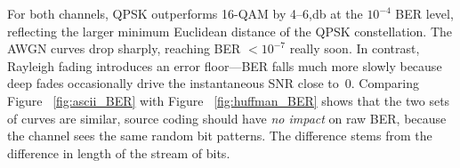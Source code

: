 For both channels, QPSK outperforms 16-QAM by 4–6,\si{\decibel} at the $10^{-4}$ BER level, reflecting the larger minimum Euclidean distance of the QPSK constellation. The AWGN curves drop sharply, reaching BER \(<10^{-7}\) really soon. In contrast, Rayleigh fading introduces an error floor—BER falls much more slowly because deep fades occasionally drive the instantaneous SNR close to~0. Comparing Figure ~\ref{fig:ascii_BER} with Figure ~\ref{fig:huffman_BER} shows that the two sets of curves are similar, source coding should have \emph{no impact} on raw BER, because the channel sees the same random bit patterns. The  difference stems from the difference in length of the stream of bits.


